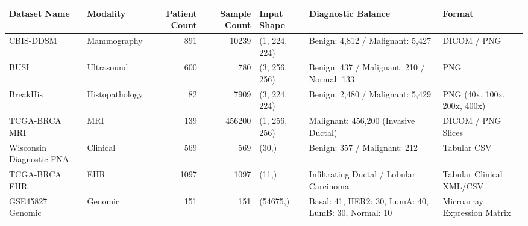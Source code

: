 \begin{tabular}{llrrlll}
\toprule
Dataset Name & Modality & Patient Count & Sample Count & Input Shape & Diagnostic Balance & Format \\
\midrule
CBIS-DDSM & Mammography & 891 & 10239 & (1, 224, 224) & Benign: 4,812 / Malignant: 5,427 & DICOM / PNG \\
BUSI & Ultrasound & 600 & 780 & (3, 256, 256) & Benign: 437 / Malignant: 210 / Normal: 133 & PNG \\
BreakHis & Histopathology & 82 & 7909 & (3, 224, 224) & Benign: 2,480 / Malignant: 5,429 & PNG (40x, 100x, 200x, 400x) \\
TCGA-BRCA MRI & MRI & 139 & 456200 & (1, 256, 256) & Malignant: 456,200 (Invasive Ductal) & DICOM / PNG Slices \\
Wisconsin Diagnostic FNA & Clinical & 569 & 569 & (30,) & Benign: 357 / Malignant: 212 & Tabular CSV \\
TCGA-BRCA EHR & EHR & 1097 & 1097 & (11,) & Infiltrating Ductal / Lobular Carcinoma & Tabular Clinical XML/CSV \\
GSE45827 Genomic & Genomic & 151 & 151 & (54675,) & Basal: 41, HER2: 30, LumA: 40, LumB: 30, Normal: 10 & Microarray Expression Matrix \\
\bottomrule
\end{tabular}
